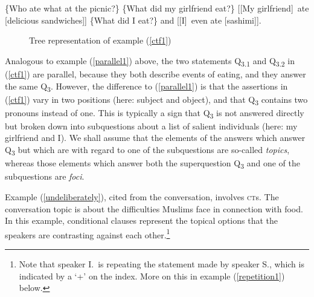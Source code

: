 \documentclass[output=paper
,modfonts
,nonflat]{langsci/langscibook}
\begin{document}
\begin{exe}
	\ex\label{ctf1}
	\begin{xlist}
		 \{Who ate what at the picnic?\}
		 \{What did my girlfriend eat?\}
		 {[[My girlfriend]\ctopic\ ate [delicious sandwiches]\focus]\sq}
		 \{What did I eat?\}
		 {and [[I]\ctopic\ even ate [sashimi]\focus]\sq.}
	\end{xlist}
\end{exe}

\begin{figure}
	\caption{Tree representation of example (\ref{ctf1})}
	\label{fig:toy3}
\end{figure}

\noindent Analogous to example (\ref{parallel1}) above, the two statements Q\textsubscript{{3.1}} and Q\textsubscript{{3.2}} in (\ref{ctf1}) are parallel, because they both describe events of eating, and they answer the same  Q\textsubscript{3}. However, the difference to (\ref{parallel1}) is that the assertions in (\ref{ctf1}) vary in two positions (here: subject and object), and that Q\textsubscript{3} contains two  pronouns instead of one. This is typically a sign that Q\textsubscript{3} is not answered directly but broken down into subquestions about a list of salient individuals (here: my girlfriend and I). We shall assume that the elements of the answers which answer Q\textsubscript{3} but which are  with regard to one of the subquestions are so-called \textit{ topics}, whereas those elements which answer both the superquestion Q\textsubscript{3} and one of the subquestions are \textit{foci}.

Example (\ref{undeliberately}), cited from the  conversation, involves \textsc{ct}s. The conversation topic is about the difficulties   Muslims face in connection with  food. In this example, conditional clauses represent the topical options \citep{haijo78,ebech14} that the speakers are contrasting against each other.\footnote{Note that speaker I.\ is repeating the statement made by speaker S., which is indicated by a `+' on the index. More on this in example (\ref{repetition1}) below.} 
\end{document}
